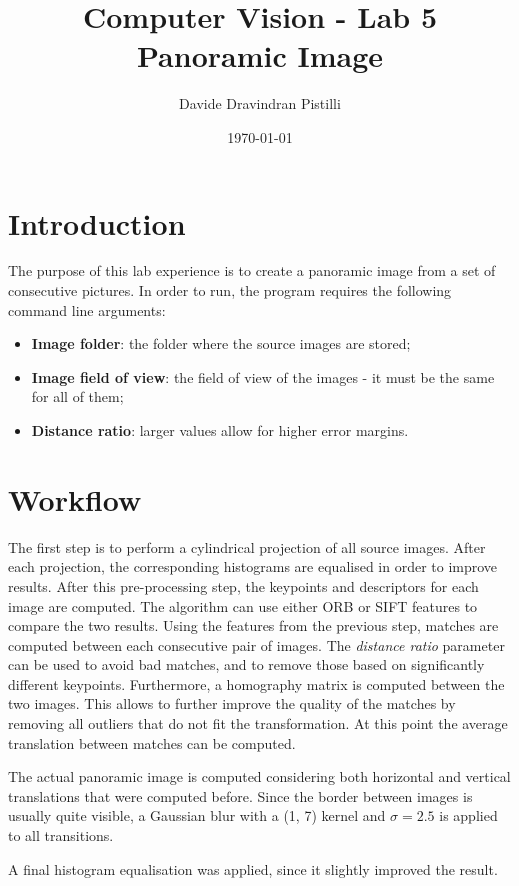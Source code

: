 \documentclass{article}
\title{Computer Vision - Lab 5 \\ Panoramic Image} %
\author{Davide Dravindran Pistilli} %
\date{\today} %
\begin{document}
\maketitle %

\section{Introduction}
The purpose of this lab experience is to create a panoramic image from a set of consecutive pictures.
In order to run, the program requires the following command line arguments:
\begin{itemize}
\item \textbf{Image folder}: the folder where the source images are stored;
\item \textbf{Image field of view}: the field of view of the images - it must be the same for all of them;
\item \textbf{Distance ratio}: larger values allow for higher error margins.
\end{itemize}

\section{Workflow}
The first step is to perform a cylindrical projection of all source images. After each projection, the corresponding histograms are equalised in order to improve results.
After this pre-processing step, the keypoints and descriptors for each image are computed. The algorithm can use either ORB or SIFT features to compare the two results.
Using the features from the previous step, matches are computed between each consecutive pair of images. The \textit{distance ratio} parameter can be used to avoid bad matches, and to remove those based on significantly different keypoints.
Furthermore, a homography matrix is computed between the two images. This allows to further improve the quality of the matches by removing all outliers that do not fit the transformation.
At this point the average translation between matches can be computed.

The actual panoramic image is computed considering both horizontal and vertical translations that were computed before. Since the border between images is usually quite visible, a Gaussian blur with a (1, 7) kernel and $\sigma=2.5$ is applied to all transitions.

A final histogram equalisation was applied, since it slightly improved the result.
\end{document}
